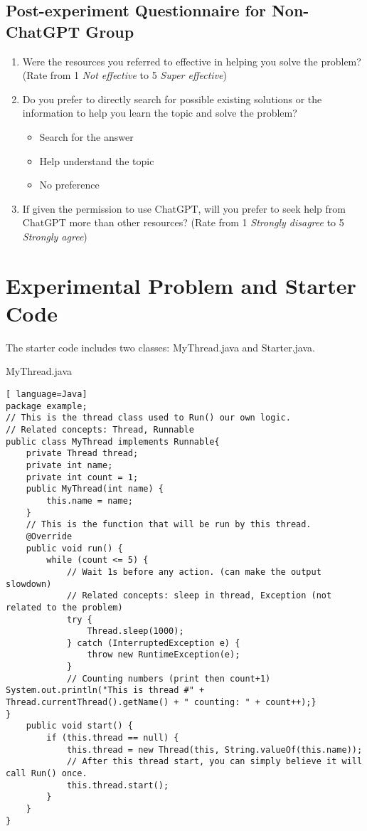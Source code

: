 \documentclass[manuscript,screen,nonacm]{acmart}
\begin{document}
\begin{appendices}
\subsection{Post-experiment Questionnaire for Non-ChatGPT Group}\label{NONChatGPTpost}
\begin{enumerate}
    \item Were the resources you referred to effective in helping you solve the problem? (Rate from 1 \textit{Not effective} to 5 \textit{Super effective})
    \item Do you prefer to directly search for possible existing solutions or the information to help you learn the topic and solve the problem?
        \begin{itemize}
            \item Search for the answer
            \item Help understand the topic
            \item No preference
        \end{itemize}
    \item If given the permission to use ChatGPT, will you prefer to seek help from ChatGPT more than other resources? (Rate from 1 \textit{Strongly disagree} to 5 \textit{Strongly agree})
\end{enumerate}
    

\section{Experimental Problem and Starter Code}\label{StarterCode}

The starter code includes two classes: MyThread.java and Starter.java.

MyThread.java
\begin{lstlisting}[ language=Java]
package example;
// This is the thread class used to Run() our own logic.
// Related concepts: Thread, Runnable
public class MyThread implements Runnable{
    private Thread thread;
    private int name;
    private int count = 1;
    public MyThread(int name) {
        this.name = name;
    }
    // This is the function that will be run by this thread.
    @Override
    public void run() {
        while (count <= 5) {
            // Wait 1s before any action. (can make the output slowdown)
            // Related concepts: sleep in thread, Exception (not related to the problem)
            try {
                Thread.sleep(1000);
            } catch (InterruptedException e) {
                throw new RuntimeException(e);
            }
            // Counting numbers (print then count+1)
System.out.println("This is thread #" + Thread.currentThread().getName() + " counting: " + count++);}
}
    public void start() {
        if (this.thread == null) {
            this.thread = new Thread(this, String.valueOf(this.name));
            // After this thread start, you can simply believe it will call Run() once.
            this.thread.start();
        }
    }
}
\end{lstlisting}


\end{appendices}
\end{document}
